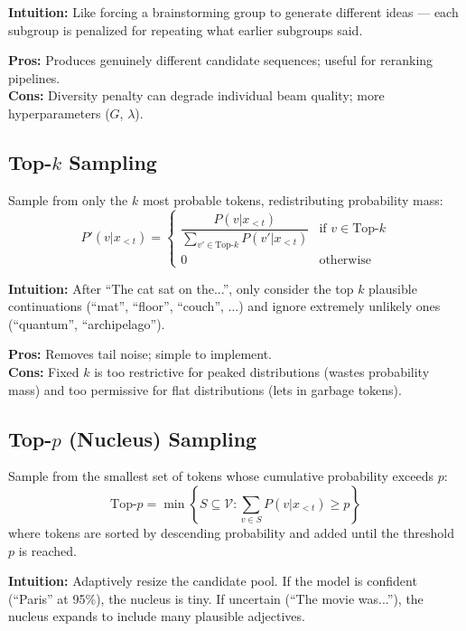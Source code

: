 \textbf{Intuition:} Like forcing a brainstorming group to generate different ideas --- each subgroup is penalized for repeating what earlier subgroups said.

\textbf{Pros:} Produces genuinely different candidate sequences; useful for reranking pipelines.\\

\textbf{Cons:} Diversity penalty can degrade individual beam quality; more hyperparameters ($G$, $\lambda$).

\subsection{Top-$k$ Sampling}
\label{top-k-sampling}

Sample from only the $k$ most probable tokens, redistributing probability mass: 
\[
P'(v | x_{<t}) = \begin{cases}
    \dfrac{P(v | x_{<t})}{\sum_{v' \in \text{Top-}k} P(v' | x_{<t})} & \text{if } v \in \text{Top-}k \\[6pt]
    0 & \text{otherwise}
  \end{cases}
\]

\textbf{Intuition:} After ``The cat sat on the...'', only consider the top $k$ plausible continuations (``mat'', ``floor'', ``couch'', ...) and ignore extremely unlikely ones (``quantum'', ``archipelago'').

\textbf{Pros:} Removes tail noise; simple to implement.\\

\textbf{Cons:} Fixed $k$ is too restrictive for peaked distributions (wastes probability mass) and too permissive for flat distributions (lets in garbage tokens).

\subsection{Top-$p$ (Nucleus) Sampling}
\label{top-p-nucleus-sampling}

Sample from the smallest set of tokens whose cumulative probability exceeds $p$: 
\[
\text{Top-}p = \min \left\{ S \subseteq \mathcal{V} : \sum_{v \in S} P(v | x_{<t}) \geq p \right\}
\]
 where tokens are sorted by descending probability and added until the threshold $p$ is reached.

\textbf{Intuition:} Adaptively resize the candidate pool. If the model is confident (``Paris'' at 95\%), the nucleus is tiny. If uncertain (``The movie was...''), the nucleus expands to include many plausible adjectives.

